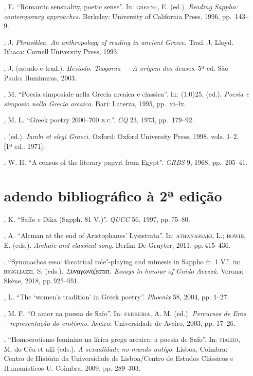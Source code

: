 \begin{bibliohedra}
, E. “Romantic sensuality, poetic sense”. In: \textsc{greene}, E.
(ed.). \textit{Reading Sappho: contemporary approaches.} Berkeley: University
of California Press, 1996, pp.~143--9.

, J. \textit{Phrasiklea. An anthropology of reading in ancient
Greece.} Trad. J. Lloyd. Ithaca: Cornell University Press, 1993.

, J. (estudo e trad.). \textit{Hesíodo. Teogonia --- A origem dos
deuses.} 5ª ed. São Paulo: Iluminuras, 2003.

, M. “Poesia simposiale nella Grecia arcaica e classica”. In:
\line(1,0){25}. (ed.). \textit{Poesia e simposio nella Grecia arcaica.}
Bari: Laterza, 1995, pp.~xi--lx.

, M. L. “Greek poetry 2000--700 \textsc{b.c.”.} \textit{CQ} 23, 1973,
pp.~179--92.

\titidem. (ed.). \textit{Iambi et elegi Graeci.} Oxford: Oxford University
Press, 1998. vols. 1--2. [1ª ed.: 1971].

, W. H. “A census of the literary papyri from Egypt”.
\textit{GRBS} 9, 1968, pp.~205--41.



\section*{adendo bibliográfico à 2ª edição}

, K. “Saffo e Dika (Sapph. 81 V.)”. \textit{QUCC} 56, 1997, pp.\,75--80.

, A. “Alcman at the end of Aristophanes' Lysistrata”. In: \textsc{athanassaki}, L.; \textsc{bowie}, E. (eds.). \textit{Archaic and classical song}. Berlin: De Gruyter, 2011, pp.\,415--436.

\titidem.  “Symmachos esso: theatrical role"-playing and mimesis in Sappho fr. 1 V.”. in: \textsc{biggliazzi}, S. (eds.). \textit{Συναγωνίζεσται. Essays in honour of Guido Avezzù}. Verona: Skène, 2018, pp.\,925--951.


, L. “The ‘women’s tradition’ in Greek poetry”. \textit{Phoenix} 58, 2004, pp. 1--27.

, M. F. “O amor na poesia de Safo”. In: \textsc{ferreira}, A. M. (ed.). \textit{Percursos de Eros -- representação do erotismo}. Aveiro: Universidade de Aveiro, 2003, pp. 17--26.

\titidem. “Homoerotismo feminino na lírica grega arcaica: a poesia de Safo”. In: \textsc{fialho}, M. do Céu et alii (eds.). \textit{A sexualidade no mundo antigo}. Lisboa, Coimbra: Centro de História da Universidade de Lisboa/Centro de Estudos Clássicos e Humanísticos U. Coimbra, 2009, pp. 289--303. 


\end{bibliohedra}
